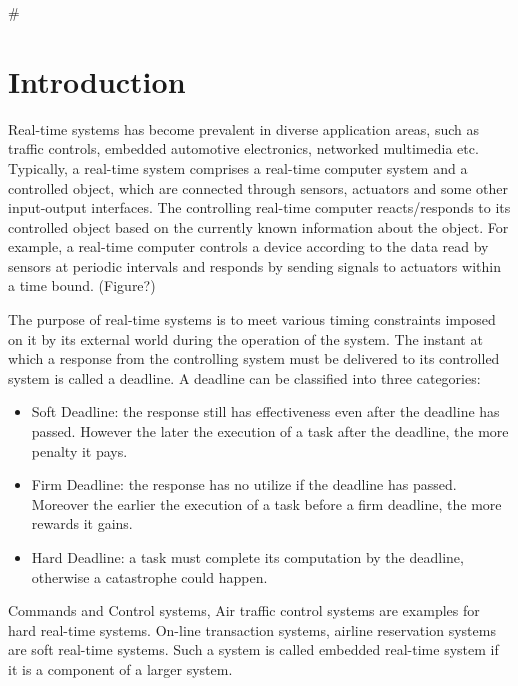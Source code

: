 \documentclass[preprint,12pt]{elsarticle}
\begin{document}
#\linenumbers

\section{Introduction} \label{S:1}

Real-time systems has become prevalent in diverse application areas, such as traffic controls, embedded automotive electronics, networked multimedia etc. Typically, a real-time system comprises a real-time computer system and a controlled object, which are connected through sensors, actuators and some other input-output interfaces. The controlling real-time computer reacts/responds to its controlled object based on the currently known information about the object. For example, a real-time computer controls a device according to the data read by sensors at periodic intervals and responds by sending signals to actuators within a time bound. (Figure?)

The purpose of real-time systems is to meet various timing constraints imposed on it by its external world during the operation of the system.
The instant at which a response from the controlling system must be delivered to its controlled system is called a deadline. A deadline can be classified into three categories\cite{mohammadi2005scheduling}:

\begin{itemize}
\item Soft Deadline: the response still has effectiveness even after the deadline has passed. However the later the execution of a task after the deadline, the more penalty it pays.
\item Firm Deadline: the response has no utilize if the deadline has passed. Moreover the earlier the execution of a task before a firm deadline, the more rewards it gains.

\item Hard Deadline: a task must complete its computation by the deadline, otherwise a catastrophe could happen.

\end{itemize}

Commands and Control systems, Air traffic control systems are examples for hard real-time systems. On-line transaction systems, airline reservation systems are soft real-time systems\cite{davis2011survey}. Such a system is called embedded real-time system if it is a component of a larger system.
\end{document}
